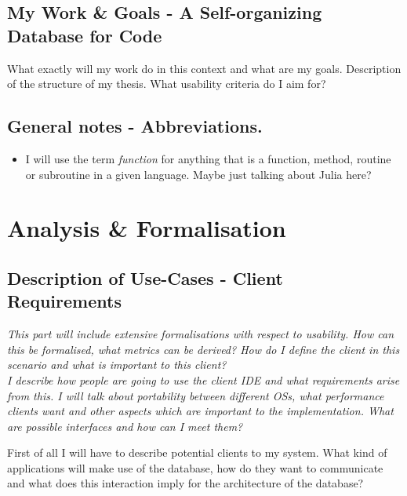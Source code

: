 \documentclass[twoside, 11pt]{scrartcl}
\begin{document}
\subsection{My Work \& Goals - A Self-organizing Database for Code}
What exactly will my work do in this context and what are my goals. 
Description of the structure of my thesis. What usability criteria do I aim for?\\

\subsection*{General notes - Abbreviations.}
\begin{itemize}
	\item I will use the term \textit{function} for anything that is a function, method, routine or subroutine in a given language. Maybe just talking about Julia here?
\end{itemize}



\section{Analysis \& Formalisation}
\label{sec:analysis}

\subsection{Description of Use-Cases - Client Requirements}
\label{sec:clientReq}
\textit{This part will include extensive formalisations with respect to usability. How can this be formalised, what metrics can be derived? How do I define the client in this scenario and what is important to this client?\\
I describe how people are going to use the client IDE and what requirements arise from this. I will talk about portability between different OSs, what performance clients want and other aspects which are important to the implementation. What are possible interfaces and how can I meet them?}

First of all I will have to describe potential clients to my system. What kind of applications will make use of the database, how do they want to communicate and what does this interaction imply for the architecture of the database?
\end{document}
